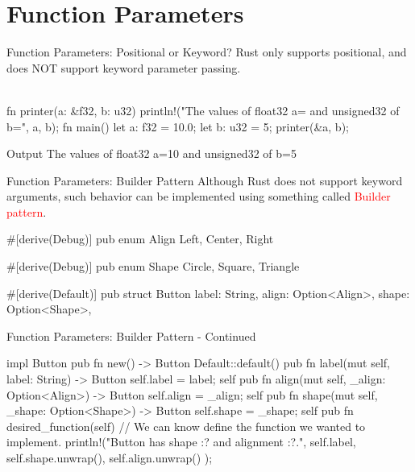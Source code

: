 \documentclass[10pt,xcolor={dvipsnames}, aspectratio=169]{beamer}
\begin{document}
\section{Function Parameters}
\begin{frame}[fragile]{Function Parameters: Positional or Keyword?}
	    Rust only supports positional, and does NOT support keyword parameter passing. \\ \\
	   \begin{rustcode}
fn printer(a: &f32, b: u32) {
    println!("The values of float32 a={} and unsigned32 of b={}", a, b);
}
fn main() {
    let a: f32 = 10.0;
    let b: u32 = 5;
    printer(&a, b);
}
        \end{rustcode}
\begin{block}{Output}
The values of float32 a=10 and unsigned32 of b=5
	\end{block}
\end{frame}
\begin{frame}[fragile]{Function Parameters: Builder Pattern}
    Although Rust does not support keyword arguments, such behavior can be implemented using something called \textcolor{red}{Builder pattern}. \\
	       \begin{rustcode}
#[derive(Debug)]
pub enum Align { Left, Center, Right }

#[derive(Debug)]
pub enum Shape { Circle, Square, Triangle }

#[derive(Default)]
pub struct Button {
    label: String,
    align: Option<Align>,
    shape: Option<Shape>,
}
 \end{rustcode}
    \end{frame}

\begin{frame}[fragile]{Function Parameters: Builder Pattern  - Continued}
	       \begin{rustcode}
impl Button {
    pub fn new() -> Button { Default::default() }
    pub fn label(mut self, label: String) -> Button {
        self.label = label; self
    }
    pub fn align(mut self, _align: Option<Align>) -> Button {
        self.align = _align; self
    }
    pub fn shape(mut self, _shape: Option<Shape>) -> Button {
        self.shape = _shape; self
    }
    pub fn desired_function(self) { // We can know define the function we wanted to implement.
        println!("Button {} has shape {:?} and alignment {:?}.", 
            self.label, self.shape.unwrap(), self.align.unwrap()
        );
    }
}
        \end{rustcode}
\end{frame}
\end{document}
